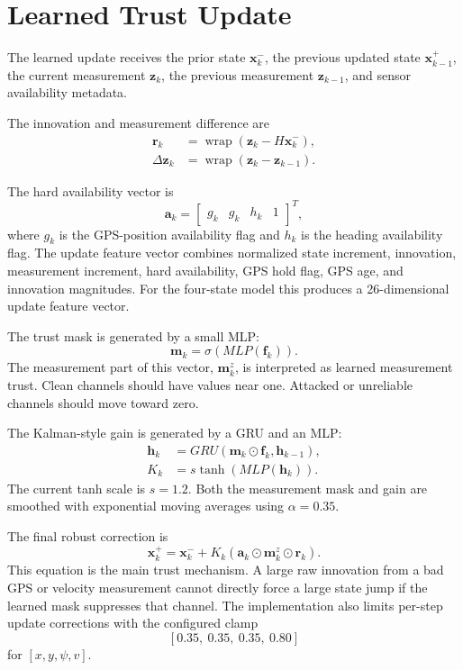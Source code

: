 \documentclass[11pt,a4paper]{article}
\newcommand{\state}{\bm{x}}
\newcommand{\meas}{\bm{z}}
\newcommand{\gain}{K}
\newcommand{\mask}{\bm{m}}
\newcommand{\avail}{\bm{a}}
\newcommand{\wrap}{\operatorname{wrap}}
\begin{document}
\section{Learned Trust Update}

The learned update receives the prior state $\state_k^-$, the previous updated
state $\state_{k-1}^+$, the current measurement $\meas_k$, the previous
measurement $\meas_{k-1}$, and sensor availability metadata.

The innovation and measurement difference are
\begin{align}
  \bm{r}_k &= \wrap(\meas_k - H\state_k^-), \\
  \Delta \meas_k &= \wrap(\meas_k - \meas_{k-1}).
\end{align}

The hard availability vector is
\begin{equation}
  \avail_k =
  \begin{bmatrix}
    g_k & g_k & h_k & 1
  \end{bmatrix}^{T},
\end{equation}
where $g_k$ is the GPS-position availability flag and $h_k$ is the heading
availability flag. The update feature vector combines normalized state
increment, innovation, measurement increment, hard availability, GPS hold flag,
GPS age, and innovation magnitudes. For the four-state model this produces a
26-dimensional update feature vector.

The trust mask is generated by a small MLP:
\begin{equation}
  \mask_k = \sigma(MLP(\bm{f}_k)).
\end{equation}
The measurement part of this vector, $\mask_k^z$, is interpreted as learned
measurement trust. Clean channels should have values near one. Attacked or
unreliable channels should move toward zero.

The Kalman-style gain is generated by a GRU and an MLP:
\begin{align}
  \bm{h}_k &= GRU(\mask_k \odot \bm{f}_k, \bm{h}_{k-1}), \\
  \gain_k &= s\tanh(MLP(\bm{h}_k)).
\end{align}
The current tanh scale is $s=1.2$. Both the measurement mask and gain are
smoothed with exponential moving averages using $\alpha=0.35$.

The final robust correction is
\begin{equation}
  \state_k^+
  =
  \state_k^-
  +
  \gain_k
  \left(
    \avail_k \odot \mask_k^z \odot \bm{r}_k
  \right).
\end{equation}
This equation is the main trust mechanism. A large raw innovation from a bad GPS
or velocity measurement cannot directly force a large state jump if the learned
mask suppresses that channel. The implementation also limits per-step update
corrections with the configured clamp
\[
  [0.35,\ 0.35,\ 0.35,\ 0.80]
\]
for $[x,y,\psi,v]$.
\end{document}
